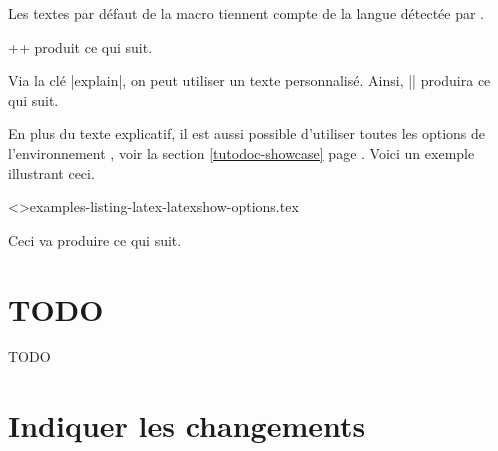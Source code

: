 \begin{tdocnote}
    Les textes par défaut de la macro  tiennent compte de la langue détectée par \thisproj.
\end{tdocnote}


\begin{tdocexa}
    \tdoclatexin++ produit ce qui suit.

    \smallskip
    
\end{tdocexa}


\begin{tdocexa}
    Via la clé \tdoclatexin|explain|, on peut utiliser un texte personnalisé. Ainsi, \tdoclatexin|| produira ce qui suit.

    \smallskip

\end{tdocexa}


\begin{tdocexa}
    En plus du texte explicatif, il est aussi possible d'utiliser toutes les options de l'environnement , voir la section \ref{tutodoc-showcase} page \pageref{tutodoc-showcase}.
    Voici un exemple illustrant ceci.

    \medskip

    \tdoclatexinput<>{examples-listing-latex-latexshow-options.tex}

    \smallskip

    Ceci va produire ce qui suit.

    \smallskip

    
\end{tdocexa}


\section{TODO}


TODO


\section{Indiquer les changements}
\label{tutodoc-changes}

